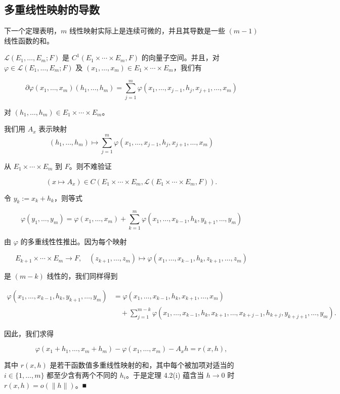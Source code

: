 \subsection*{多重线性映射的导数}

下一个定理表明，$ m $ 线性映射实际上是连续可微的，并且其导数是一些 $ (m-1) $ 线性函数的和。

\begin{proposition}

$ \mathcal{L}(E_1, \ldots, E_m; F) $ 是 $ C^1(E_1 \times \cdots \times E_m, F) $ 的向量子空间。并且，对 $ \varphi \in \mathcal{L}(E_1, \ldots, E_m; F) $ 及 $ (x_1, \ldots, x_m) \in E_1 \times \cdots \times E_m $，我们有

\[
\partial\varphi(x_1, \ldots, x_m)(h_1, \ldots, h_m) = \sum_{j=1}^{m}\varphi(x_1, \ldots, x_{j-1}, h_j, x_{j+1}, \ldots, x_m)
\]

对 $ (h_1, \ldots, h_m) \in E_1 \times \cdots \times E_m $。

\proofhead
我们用 $ A_x $ 表示映射
\[
(h_1, \ldots, h_m) \mapsto \sum_{j=1}^{m}\varphi(x_1, \ldots, x_{j-1}, h_j, x_{j+1}, \ldots, x_m)
\]

从 $ E_1 \times \cdots \times E_m $ 到 $ F $。则不难验证

\[
(x \mapsto A_x) \in C(E_1 \times \cdots \times E_m, \mathcal{L}(E_1 \times \cdots \times E_m, F)) .
\]

令 $ y_k := x_k + h_k $，则等式

\[
\varphi(y_1, \ldots, y_m) = \varphi(x_1, \ldots, x_m) + \sum_{k=1}^{m}\varphi(x_1, \ldots, x_{k-1}, h_k, y_{k+1}, \ldots, y_m)
\]

由 $ \varphi $ 的多重线性性推出。因为每个映射

\[
E_{k+1} \times \cdots \times E_m \to F , \quad (z_{k+1}, \ldots, z_m) \mapsto \varphi(x_1, \ldots, x_{k-1}, h_k, z_{k+1}, \ldots, z_m)
\]

是 $ (m-k) $ 线性的，我们同样得到

\begin{equation*}
\begin{aligned}
\varphi(x_1, \ldots, x_{k-1}, h_k, y_{k+1}, \ldots, y_m) &= \varphi(x_1, \ldots, x_{k-1}, h_k, x_{k+1}, \ldots, x_m) \\ &\quad + \sum_{j=1}^{m-k}\varphi(x_1, \ldots, x_{k-1}, h_k, x_{k+1}, \ldots, x_{k+j-1}, h_{k+j}, y_{k+j+1}, \ldots, y_m) .
\end{aligned}
\end{equation*}

因此，我们求得

\[
\varphi(x_1 + h_1, \ldots, x_m + h_m) - \varphi(x_1, \ldots, x_m) - A_x h = r(x, h) ,
\]

其中 $ r(x, h) $ 是若干函数值多重线性映射的和，其中每个被加项对适当的 $ i \in \{1, \ldots, m\} $ 都至少含有两个不同的 $ h_i $。于是定理 4.2(i) 蕴含当 $ h \to 0 $ 时 $ r(x, h) = o(\|h\|) $。\nobreak\hspace{0.35em}■

\end{proposition}

